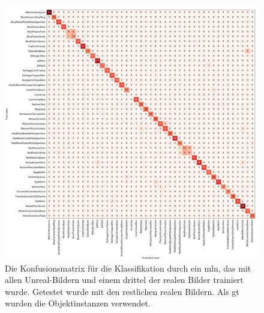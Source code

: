 \begin{figure}
\centering
	\includegraphics[scale=.3]{img/chapter6/UnrealRealMixedGTInstance.png}
\caption[Konfusionsmatrix der Objektinstanzen Klassifikation mit gemischtem Trainingsset und realem Testset]{Die Konfusionsmatrix für die Klassifikation durch ein \gls{mln}, das mit allen Unreal-Bildern und einem drittel der realen Bilder trainiert wurde. Getestet wurde mit den restlichen realen Bildern. Als \gls{gt} wurden die Objektinstanzen verwendet.}
\label{fig:UnrealRealMixedGTInstance_confMatrix}
\end{figure}  

